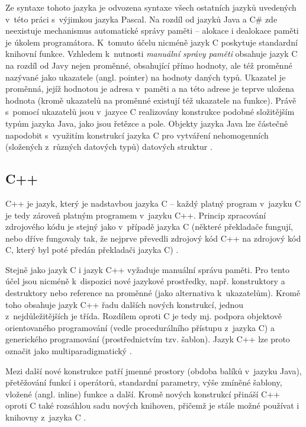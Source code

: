 \documentclass[czech,BP]{thesiskiv}
\begin{document}
Ze syntaxe tohoto jazyka je odvozena syntaxe všech ostatních jazyků uvedených v~této práci s~výjimkou jazyka Pascal. Na rozdíl od jazyků Java a C\# zde neexistuje mechanismus automatické správy paměti – alokace i dealokace paměti je úkolem programátora. K~tomuto účelu nicméně jazyk C poskytuje standardní knihovní funkce. Vzhledem k~nutnosti \textit{manuální správy paměti} obsahuje jazyk C na rozdíl od Javy nejen proměnné, obsahující přímo hodnoty, ale též proměnné nazývané jako ukazatele (angl. pointer) na hodnoty daných typů. Ukazatel je proměnná, jejíž hodnotou je adresa v~paměti a na této adrese je teprve uložena hodnota (kromě ukazatelů na proměnné existují též ukazatele na funkce). Právě s~pomocí ukazatelů jsou v~jazyce C realizovány konstrukce podobné složitějším typům jazyka Java, jako jsou řetězce a pole. Objekty jazyka Java lze částečně napodobit s~využitím konstrukcí jazyka C pro vytváření nehomogenních (složených z~různých datových typů) datových struktur \cite{c-book, c-guide}.

\subsection{C++}\label{sec:cpp-overview}
C++ je jazyk, který je nadstavbou jazyka C -- každý platný program v~jazyku C je tedy zároveň platným programem v~jazyku C++. Princip zpracování zdrojového kódu je stejný jako v~případě jazyka C (některé překladače fungují, nebo dříve fungovaly tak, že nejprve převedli zdrojový kód C++ na zdrojový kód C, který byl poté předán překladači jazyka C) \cite{cpp-book}.\par
Stejně jako jazyk C i jazyk C++ vyžaduje manuální správu paměti. Pro tento účel jsou nicméně k~dispozici nové jazykové prostředky, např. konstruktory a destruktory nebo reference na proměnné (jako alternativa k~ukazatelům). Kromě toho obsahuje jazyk C++ řadu dalších nových konstrukcí, jednou z~nejdůležitějších je třída. Rozdílem oproti C je tedy mj. podpora objektově orientovaného programování (vedle procedurálního přístupu z~jazyka C) a generického programování (prostřednictvím tzv. šablon). Jazyk C++ lze proto označit jako multiparadigmatický \cite{cpp-book, cpp-guide-classes}.\par
Mezi další nové konstrukce patří jmenné prostory (obdoba balíků v~jazyku Java), přetěžování funkcí i operátorů, standardní parametry, výše zmíněné šablony, vložené (angl. inline) funkce a další. Kromě nových konstrukcí přináší C++ oproti C také rozsáhlou sadu nových knihoven, přičemž je stále možné používat i knihovny z~jazyka C \cite{cpp-book}.\par
\end{document}
